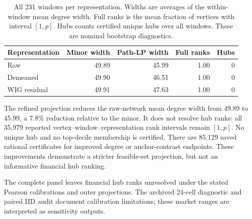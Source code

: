 \begin{table}[htbp]
\caption{All 231 windows per representation. Widths are averages of the within-window mean degree width. Full ranks is the mean fraction of vertices with interval $[1,p]$. Hubs counts certified unique hubs over all windows. These are nominal bootstrap diagnostics.}\label{tab:gpw}
\centering\small
\begin{tabular}{lrrrr}
\toprule
Representation & Minor width & Path-LP width & Full ranks & Hubs \\
\midrule
Raw & 49.89 & 45.99 & 1.00 & 0 \\
Demeaned & 49.90 & 46.51 & 1.00 & 0 \\
WIG residual & 49.91 & 47.63 & 1.00 & 0 \\
\bottomrule
\end{tabular}
\end{table}
The refined projection reduces the raw-network mean degree width from 49.89 to 45.99, a 7.8\% reduction relative to the minor. It does not resolve hub ranks: all 35,979 reported vertex--window--representation rank intervals remain $[1,p]$. No unique hub and no top-decile membership is certified. There are 85,129 saved rational certificates for improved degree or anchor-contrast endpoints. These improvements demonstrate a stricter feasible-set projection, but not an informative financial hub ranking.

The complete panel leaves financial hub ranks unresolved under the stated Pearson calibrations and outer projections. The archived 24-cell diagnostic and paired IID audit document calibration limitations; these market ranges are interpreted as sensitivity outputs.
